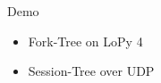 \documentclass[aspectratio=169]{beamer}
\begin{document}
\begin{frame}[c]{Demo}
\begin{itemize}
\item Fork-Tree on LoPy 4
\item Session-Tree over UDP
\end{itemize}

\end{frame}

\end{document}
